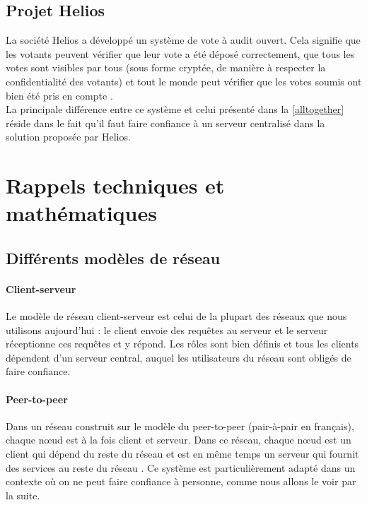 \documentclass[10pt,a4paper,twoside]{article}
\numberwithin{equation}{section}
\begin{document}
		
		\subsection{Projet Helios}
			La société Helios a développé un système de vote à audit ouvert. Cela signifie que les votants peuvent vérifier que leur vote a été déposé correctement, que tous les votes sont visibles par tous (sous forme cryptée, de manière à respecter la confidentialité des votants) et tout le monde peut vérifier que les votes soumis ont bien été pris en compte \cite{wiki:Helios_voting}.\\
			
			La principale différence entre ce système et celui présenté dans la \autoref{alltogether} réside dans le fait qu'il faut faire confiance à un serveur centralisé dans la solution proposée par Helios.
			

\section{Rappels techniques et mathématiques}
	
	\subsection{Différents modèles de réseau}
		\paragraph{Client-serveur} \label{client-server}
			Le modèle de réseau client-serveur est celui de la plupart des réseaux que nous utilisons aujourd'hui : le client envoie des requêtes au serveur et le serveur réceptionne ces requêtes et y répond. Les rôles sont bien définis et tous les clients dépendent d'un serveur central, auquel les utilisateurs du réseau sont obligés de faire confiance.
		
		\paragraph{Peer-to-peer} \label{P2P}
			Dans un réseau construit sur le modèle du peer-to-peer (pair-à-pair en français), chaque n\oe ud est à la fois client et serveur. Dans ce réseau, chaque n\oe ud est un client qui dépend du reste du réseau et est en même temps un serveur qui fournit des services au reste du réseau \cite{wiki:p2p}. Ce système est particulièrement adapté dans un contexte où on ne peut faire confiance à personne, comme nous allons le voir par la suite.
		
\end{document}
